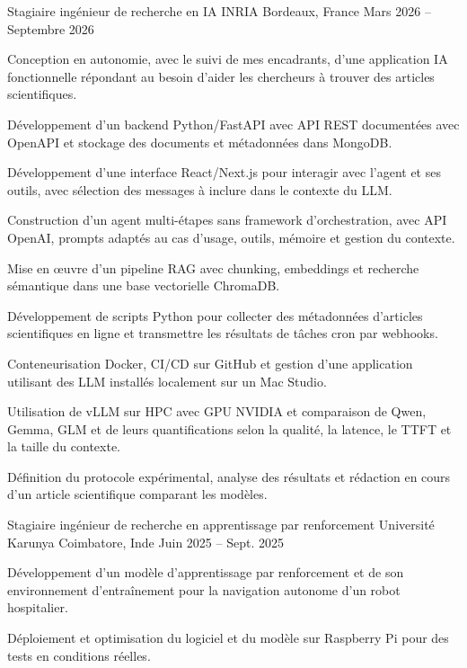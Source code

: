 
\begin{cventries}
  \cventry
    {Stagiaire ingénieur de recherche en IA}
    {INRIA}
    {Bordeaux, France}
    {Mars 2026 -- Septembre 2026}
    {
      \begin{cvitems}
        \item {Conception en autonomie, avec le suivi de mes encadrants, d’une application IA fonctionnelle répondant au besoin d’aider les chercheurs à trouver des articles scientifiques.}
        \item {Développement d’un backend Python/FastAPI avec API REST documentées avec OpenAPI et stockage des documents et métadonnées dans MongoDB.}
        \item {Développement d’une interface React/Next.js pour interagir avec l’agent et ses outils, avec sélection des messages à inclure dans le contexte du LLM.}
        \item {Construction d’un agent multi-étapes sans framework d’orchestration, avec API OpenAI, prompts adaptés au cas d’usage, outils, mémoire et gestion du contexte.}
        \item {Mise en œuvre d’un pipeline RAG avec chunking, embeddings et recherche sémantique dans une base vectorielle ChromaDB.}
        \item {Développement de scripts Python pour collecter des métadonnées d’articles scientifiques en ligne et transmettre les résultats de tâches cron par webhooks.}
        \item {Conteneurisation Docker, CI/CD sur GitHub et gestion d’une application utilisant des LLM installés localement sur un Mac Studio.}
        \item {Utilisation de vLLM sur HPC avec GPU NVIDIA et comparaison de Qwen, Gemma, GLM et de leurs quantifications selon la qualité, la latence, le TTFT et la taille du contexte.}
        \item {Définition du protocole expérimental, analyse des résultats et rédaction en cours d’un article scientifique comparant les modèles.}
      \end{cvitems}
    }

  \cventry
    {Stagiaire ingénieur de recherche en apprentissage par renforcement}
    {Université Karunya}
    {Coimbatore, Inde}
    {Juin 2025 -- Sept. 2025}
    {
      \begin{cvitems}
        \item {Développement d’un modèle d’apprentissage par renforcement et de son environnement d’entraînement pour la navigation autonome d’un robot hospitalier.}
        \item {Déploiement et optimisation du logiciel et du modèle sur Raspberry Pi pour des tests en conditions réelles.}
      \end{cvitems}
    }
\end{cventries}
